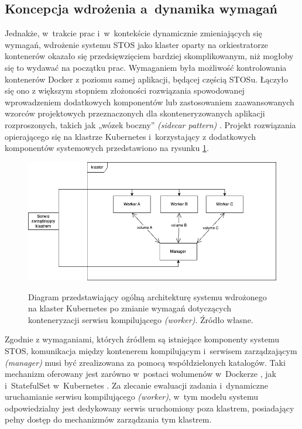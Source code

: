 \subsection{Koncepcja wdrożenia a~dynamika wymagań}
Jednakże, w~trakcie prac i~w~kontekście dynamicznie zmieniających się wymagań, wdrożenie systemu STOS jako klaster oparty na orkiestratorze kontenerów okazało się przedsięwzięciem bardziej skomplikowanym, niż mogłoby się to wydawać na początku prac. Wymaganiem była możliwość kontrolowania kontenerów Docker z poziomu samej aplikacji, będącej częścią STOSu. Łączyło się ono z większym stopniem złożoności rozwiązania spowodowanej wprowadzeniem dodatkowych komponentów lub zastosowaniem zaawansowanych wzorców projektowych przeznaczonych dla skonteneryzowanych aplikacji rozproszonych, takich jak „wózek boczny” \textit{(sidecar pattern)} \cite{k8sPatterns}. Projekt rozwiązania opierającego się na klastrze Kubernetes i~korzystający z dodatkowych komponentów systemowych przedstawiono na rysunku \ref{diagramk8sFinal}.

\begin{figure}[!h]
	\begin{center}
		\resizebox{0.7\textwidth}{!} {
			\includegraphics{img/4/k8sFinal.png}
		}
		\caption[Diagram prototypu klastra Kubernetes po zmianie architektury]{Diagram przedstawiający ogólną architekturę systemu wdrożonego na klaster Kubernetes po zmianie wymagań dotyczących konteneryzacji serwisu kompilującego \textit{(worker)}. Źródło własne.}
		\label{diagramk8sFinal}
	\end{center}
\end{figure}

Zgodnie z wymaganiami, których źródłem są istniejące komponenty systemu STOS, komunikacja między kontenerem kompilującym i~serwisem zarządzającym \textit{(manager)} musi być zrealizowana za pomocą współdzielonych katalogów. Taki mechanizm oferowany jest zarówno w~postaci wolumenów w~Dockerze \cite{dockerVolume}, jak i~StatefulSet w~Kubernetes \cite{k8sStateful}. Za zlecanie ewaluacji zadania i~dynamiczne uruchamianie serwisu kompilującego \textit{(worker)}, w~tym modelu systemu odpowiedzialny jest dedykowany serwis uruchomiony poza klastrem, posiadający pełny dostęp do mechanizmów zarządzania tym klastrem.

